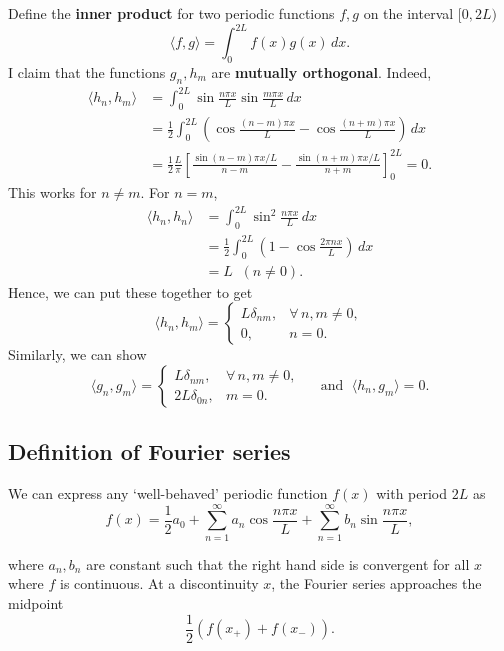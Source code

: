 \documentclass[12pt]{article}
\theoremstyle{definition}
\theoremstyle{remark}
\begin{document}
Define the \textbf{inner product} for two periodic functions $f, g$ on the interval $[0, 2L)$ 
\[
	\langle f, g \rangle = \int_{0}^{2L}f(x) g(x)\, dx
.\]
I claim that the functions $g_n, h_m$ are \textbf{mutually orthogonal}. Indeed,
\begin{align*}
	\langle h_n, h_m \rangle &= \int_{0}^{2L} \sin \frac{n \pi x}{L} \sin \frac{m \pi x}{L} \, dx \\
				 &= \frac{1}{2} \int_{0}^{2L} \left( \cos \frac{(n - m)\pi x}{L} - \cos \frac{(n + m)\pi x}{L}\right) \, dx \\
				 &= \frac{1}{2} \frac{L}{\pi} \left[ \frac{\sin (n - m) \pi x/L}{n - m} - \frac{\sin (n + m) \pi x/L}{n + m} \right]_{0}^{2L} = 0.
\end{align*}
This works for $n \neq m$. For $n = m$,
\begin{align*}
	\langle h_n, h_n \rangle &= \int_{0}^{2L} \sin^2 \frac{n \pi x}{L} \, dx \\
				 &= \frac{1}{2} \int_{0}^{2L} \left( 1 - \cos \frac{2 \pi n x}{L} \right) \, dx \\
				 &= L \;\; (n \neq 0).
\end{align*}
Hence, we can put these together to get
\[
	\langle h_n, h_m \rangle =
	\begin{cases}
		L \delta_{nm}, & \forall\,\! n, m \neq 0, \\
		0, & n = 0.
	\end{cases}
\] 
Similarly, we can show
\[
	\langle g_n, g_m \rangle =
	\begin{cases}
		L \delta_{nm}, & \forall\,\! n, m \neq 0, \\
		2L \delta_{0n}, &m = 0.
	\end{cases}
	\quad \text{ and } \; \langle h_n, g_m \rangle = 0
.\]

\subsection{Definition of Fourier series}%
\label{sub:definition_of_fourier_series}

We can express any `well-behaved' periodic function $f(x)$ with period $2L$ as
\[
	f(x) = \frac{1}{2}a_0  + \sum_{n = 1}^{\infty} a_n \cos \frac{n \pi x}{L} + \sum_{n = 1}^{\infty}b_n \sin \frac{n \pi x}{L}
,\]

where $a_n, b_n$ are constant such that the right hand side is convergent for all $x$ where $f$ is continuous. At a discontinuity $x$, the Fourier series approaches the midpoint
\[
	\frac{1}{2} \left( f(x_{+}) + f(x_{-}) \right)
.\]
\end{document}
